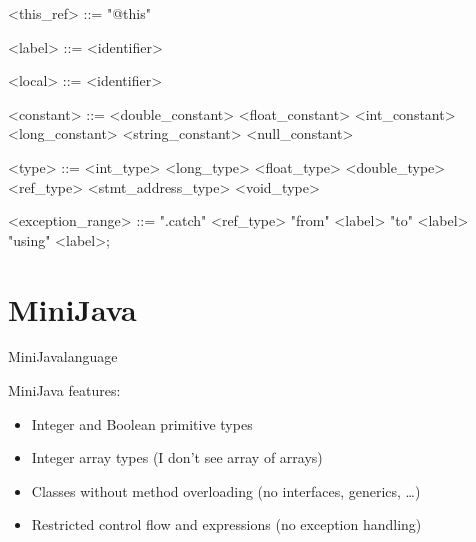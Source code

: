 \documentclass{report}
\newcommand{\minijava}{MiniJava}
\begin{document}
\begin{grammar}
<this_ref> ::= "@this"

<label> ::= <identifier>

<local> ::= <identifier>

<constant> ::= <double_constant> \alt <float_constant> \alt <int_constant> \alt <long_constant>  <string_constant> \alt <null_constant>

<type> ::= <int_type> \alt <long_type> \alt <float_type> \alt <double_type> \alt <ref_type> <stmt_address_type> \alt <void_type>

<exception_range> ::= ".catch" <ref_type> "from" <label> "to" <label> "using" <label>;

\end{grammar}




\appendix

\section{\minijava}
\label{sec:minijava}

\minijava language~\cite{miniJavaSyntax}

MiniJava features:
\begin{itemize}
\item Integer and Boolean primitive types
\item Integer array types (I don't see array of arrays)
\item Classes without method overloading (no interfaces, generics, \ldots)
\item Restricted control flow and expressions (no exception handling)
\end{itemize}
\end{document}

